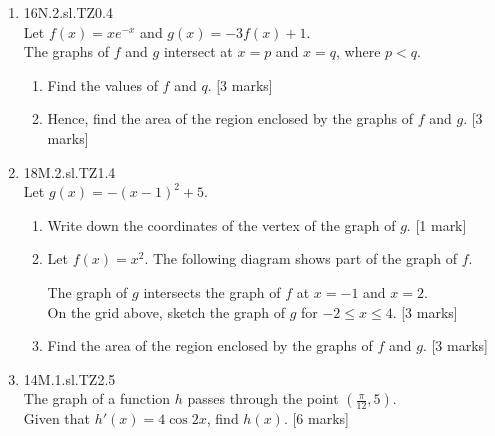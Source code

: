 \documentclass[12pt, twoside]{article}
\begin{document}
\begin{enumerate}
    \item 16N.2.sl.TZ0.4\\
    Let $f(x)=xe^{-x}$ and $g(x)=-3f(x)+1$.\\
    The graphs of $f$ and $g$ intersect at $x=p$ and $x=q$, where $p<q$.
    \begin{enumerate}
      \item Find the values of $f$ and $q$. [3 marks]
      \item Hence, find the area of the region enclosed by the graphs of $f$ and $g$. [3 marks]
    \end{enumerate}

    \item 18M.2.sl.TZ1.4\\
    Let  $g(x)=-(x-1)^2+5$.
    \begin{enumerate}
      \item Write down the coordinates of the vertex of the graph of $g$. [1 mark]
      \item Let $f(x)=x^2$. The following diagram shows part of the graph of $f$.
        \begin{center}
        \end{center}
      The graph of $g$ intersects the graph of $f$ at $x=-1$ and $x=2$.\\
      On the grid above, sketch the graph of $g$ for $-2 \leq x \leq 4$. [3 marks]
      \item Find the area of the region enclosed by the graphs of $f$ and $g$. [3 marks]
    \end{enumerate}

    \item 14M.1.sl.TZ2.5\\
    The graph of a function $h$ passes through the point $(\frac{\pi}{12},5)$.\\
    Given that $h'(x)=4 \cos 2x$, find $h(x)$. [6 marks]


\end{enumerate}
\end{document}
